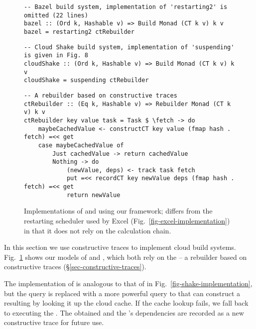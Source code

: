 \begin{figure}
\begin{verbatim}
-- Bazel build system, implementation of 'restarting2' is omitted (22 lines)
bazel :: (Ord k, Hashable v) => Build Monad (CT k v) k v
bazel = restarting2 ctRebuilder
\end{verbatim}
\vspace{1mm}
\begin{verbatim}
-- Cloud Shake build system, implementation of 'suspending' is given in Fig. 8
cloudShake :: (Ord k, Hashable v) => Build Monad (CT k v) k v
cloudShake = suspending ctRebuilder
\end{verbatim}
\vspace{1mm}
\begin{verbatim}
-- A rebuilder based on constructive traces
ctRebuilder :: (Eq k, Hashable v) => Rebuilder Monad (CT k v) k v
ctRebuilder key value task = Task $ \fetch -> do
    maybeCachedValue <- constructCT key value (fmap hash . fetch) =<< get
    case maybeCachedValue of
        Just cachedValue -> return cachedValue
        Nothing -> do
            (newValue, deps) <- track task fetch
            put =<< recordCT key newValue deps (fmap hash . fetch) =<< get
            return newValue
\end{verbatim}
\vspace{-2mm}
\caption{Implementations of \Bazel and \Cloud \Shake using our framework;
 differs from the restarting scheduler used by Excel
(Fig.~\ref{fig-excel-implementation}) in that it does not rely on the
calculation chain.}
\label{fig-bazel-cloud-shake-implementation}
\vspace{-2mm}
\end{figure}

In this section we use constructive traces to implement cloud build systems.
Fig.~\ref{fig-bazel-cloud-shake-implementation} shows our models of \Bazel and
\Cloud \Shake, which both rely on the  -- a rebuilder based on
constructive traces (\S\ref{sec-constructive-traces}).

The implementation of  is analogous to that of 
in Fig.~\ref{fig-shake-implementation}, but the  query is replaced
with a more powerful query to  that can construct a resulting
 by looking it up the cloud cache. If the cache lookup fails, we
fall back to executing the . The obtained  and the
's dependencies are recorded as a new constructive trace for future
use.


